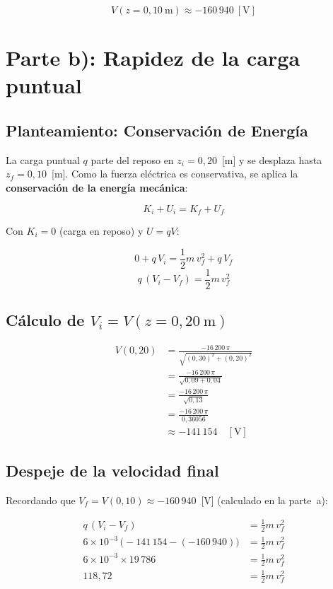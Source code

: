 \documentclass[12pt,letterpaper]{article}
\begin{document}
\[
    \boxed{V(z = 0{,}10\ \text{m}) \approx -160\,940 \ [\text{V}]}
\]

\section*{Parte b): Rapidez de la carga puntual}

\subsection*{Planteamiento: Conservaci\'on de Energ\'ia}

La carga puntual $q$ parte del reposo en $z_i = 0{,}20$~[m] y se desplaza hasta
$z_f = 0{,}10$~[m]. Como la fuerza el\'ectrica es conservativa, se aplica la
\textbf{conservaci\'on de la energ\'ia mec\'anica}:

\[
    K_i + U_i = K_f + U_f
\]

Con $K_i = 0$ (carga en reposo) y $U = qV$:

\[
    0 + q\,V_i = \frac{1}{2}m\,v_f^2 + q\,V_f
\]
\[
    q\,(V_i - V_f) = \frac{1}{2}m\,v_f^2
\]

\subsection*{C\'alculo de $V_i = V(z = 0{,}20\ \text{m})$}

\begin{align*}
    V(0{,}20) &= \frac{-16\,200\,\pi}{\sqrt{(0{,}30)^2 + (0{,}20)^2}} \\[8pt]
              &= \frac{-16\,200\,\pi}{\sqrt{0{,}09 + 0{,}04}} \\[8pt]
              &= \frac{-16\,200\,\pi}{\sqrt{0{,}13}} \\[8pt]
              &= \frac{-16\,200\,\pi}{0{,}36056} \\[8pt]
              &\approx -141\,154 \quad [\text{V}]
\end{align*}

\subsection*{Despeje de la velocidad final}

Recordando que $V_f = V(0{,}10) \approx -160\,940$~[V] (calculado en la parte~a):

\begin{align*}
    q\,(V_i - V_f) &= \frac{1}{2}m\,v_f^2 \\[6pt]
    6\times10^{-3}\,\bigl(-141\,154 - (-160\,940)\bigr) &= \frac{1}{2}m\,v_f^2 \\[6pt]
    6\times10^{-3} \times 19\,786 &= \frac{1}{2}m\,v_f^2 \\[6pt]
    118{,}72 &= \frac{1}{2}m\,v_f^2
\end{align*}
\end{document}
